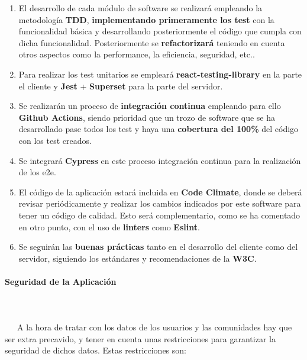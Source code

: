 \begin{enumerate}
	\item El desarrollo de cada módulo de software se realizará empleando la metodología \textbf{TDD}, \textbf{implementando primeramente los test} con la funcionalidad básica y desarrollando posteriormente el código que cumpla con dicha funcionalidad. Posteriormente se \textbf{refactorizará} teniendo en cuenta otros aspectos como la performance, la eficiencia, seguridad, etc..
	
	\item Para realizar los test unitarios se empleará \textbf{react-testing-library} en la parte el cliente y \textbf{Jest} + \textbf{Superset} para la parte del servidor.
	
	\item Se realizarán un proceso de \textbf{integración continua} empleando para ello \textbf{Github Actions}, siendo prioridad que un trozo de software que se ha desarrollado pase todos los test y haya una \textbf{cobertura del 100\%} del código con los test creados.
	
	\item Se integrará \textbf{Cypress} en este proceso integración continua para la realización de los e2e.
	
	\item El código de la aplicación estará incluida en \textbf{Code Climate}, donde se deberá revisar periódicamente y realizar los cambios indicados por este software para tener un código de calidad. Esto será complementario, como se ha comentado en otro punto, con el uso de \textbf{linters} como \textbf{Eslint}.
	
	\item Se seguirán las \textbf{buenas prácticas} tanto en el desarrollo del cliente como del servidor, siguiendo los estándares y recomendaciones de la \textbf{W3C}.
\end{enumerate}

\paragraph{Seguridad de la Aplicación}
~\\\\
\-\ \-\ \-\ A la hora de tratar con los datos de los usuarios y las comunidades hay que ser extra precavido, y tener en cuenta unas restricciones para garantizar la seguridad de dichos datos. Estas restricciones son:

